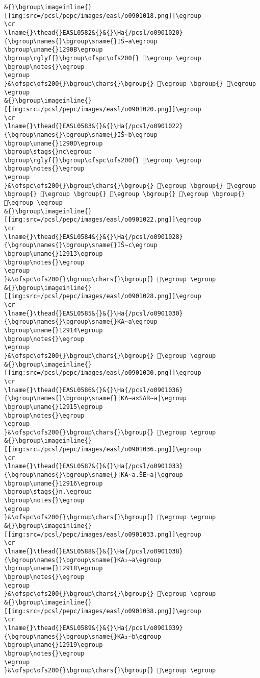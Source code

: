 \begin{verbatim}
&{}\bgroup\imageinline{}[[img:src=/pcsl/pepc/images/easl/o0901018.png]]\egroup
\cr
\lname{}\thead{}EASL0582&{}&{}\Ha{/pcsl/o0901020}{\bgroup\names{}\bgroup\sname{}IŠ∼a\egroup
\bgroup\uname{}1290B\egroup
\bgroup\rglyf{}\bgroup\ofspc\ofs200{} 𒤋\egroup \egroup
\bgroup\notes{}\egroup
\egroup
}&\ofspc\ofs200{}\bgroup\chars{}\bgroup{} 𒤌\egroup \bgroup{} 𒤋\egroup \egroup
&{}\bgroup\imageinline{}[[img:src=/pcsl/pepc/images/easl/o0901020.png]]\egroup
\cr
\lname{}\thead{}EASL0583&{}&{}\Ha{/pcsl/o0901022}{\bgroup\names{}\bgroup\sname{}IŠ∼b\egroup
\bgroup\uname{}1290D\egroup
\bgroup\stags{}nc\egroup
\bgroup\rglyf{}\bgroup\ofspc\ofs200{} 𒤍\egroup \egroup
\bgroup\notes{}\egroup
\egroup
}&\ofspc\ofs200{}\bgroup\chars{}\bgroup{} 𒤍\egroup \bgroup{} 𒤎\egroup \bgroup{} 𒤏\egroup \bgroup{} 𒤐\egroup \bgroup{} 𒤑\egroup \bgroup{} 𒤒\egroup \egroup
&{}\bgroup\imageinline{}[[img:src=/pcsl/pepc/images/easl/o0901022.png]]\egroup
\cr
\lname{}\thead{}EASL0584&{}&{}\Ha{/pcsl/o0901028}{\bgroup\names{}\bgroup\sname{}IŠ∼c\egroup
\bgroup\uname{}12913\egroup
\bgroup\notes{}\egroup
\egroup
}&\ofspc\ofs200{}\bgroup\chars{}\bgroup{} 𒤓\egroup \egroup
&{}\bgroup\imageinline{}[[img:src=/pcsl/pepc/images/easl/o0901028.png]]\egroup
\cr
\lname{}\thead{}EASL0585&{}&{}\Ha{/pcsl/o0901030}{\bgroup\names{}\bgroup\sname{}KA∼a\egroup
\bgroup\uname{}12914\egroup
\bgroup\notes{}\egroup
\egroup
}&\ofspc\ofs200{}\bgroup\chars{}\bgroup{} 𒤔\egroup \egroup
&{}\bgroup\imageinline{}[[img:src=/pcsl/pepc/images/easl/o0901030.png]]\egroup
\cr
\lname{}\thead{}EASL0586&{}&{}\Ha{/pcsl/o0901036}{\bgroup\names{}\bgroup\sname{}|KA∼a×SAR∼a|\egroup
\bgroup\uname{}12915\egroup
\bgroup\notes{}\egroup
\egroup
}&\ofspc\ofs200{}\bgroup\chars{}\bgroup{} 𒤕\egroup \egroup
&{}\bgroup\imageinline{}[[img:src=/pcsl/pepc/images/easl/o0901036.png]]\egroup
\cr
\lname{}\thead{}EASL0587&{}&{}\Ha{/pcsl/o0901033}{\bgroup\names{}\bgroup\sname{}|KA∼a.ŠE∼a|\egroup
\bgroup\uname{}12916\egroup
\bgroup\stags{}n.\egroup
\bgroup\notes{}\egroup
\egroup
}&\ofspc\ofs200{}\bgroup\chars{}\bgroup{} 𒤖\egroup \egroup
&{}\bgroup\imageinline{}[[img:src=/pcsl/pepc/images/easl/o0901033.png]]\egroup
\cr
\lname{}\thead{}EASL0588&{}&{}\Ha{/pcsl/o0901038}{\bgroup\names{}\bgroup\sname{}KA₂∼a\egroup
\bgroup\uname{}12918\egroup
\bgroup\notes{}\egroup
\egroup
}&\ofspc\ofs200{}\bgroup\chars{}\bgroup{} 𒤘\egroup \egroup
&{}\bgroup\imageinline{}[[img:src=/pcsl/pepc/images/easl/o0901038.png]]\egroup
\cr
\lname{}\thead{}EASL0589&{}&{}\Ha{/pcsl/o0901039}{\bgroup\names{}\bgroup\sname{}KA₂∼b\egroup
\bgroup\uname{}12919\egroup
\bgroup\notes{}\egroup
\egroup
}&\ofspc\ofs200{}\bgroup\chars{}\bgroup{} 𒤙\egroup \egroup

\end{verbatim}
